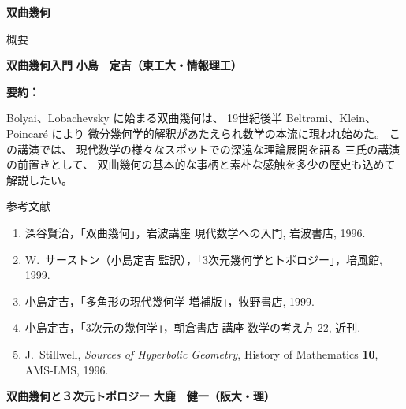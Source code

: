 \documentclass[uplatex,dvipdfmx]{jlreq}
\begin{document}
\begin{center}
  \vspace*{20pt}
  {\Huge\bfseries 双曲幾何}

  \vspace{1pc}
  {\Large 概要}
\end{center}

\vfill

\newpage

\noindent
{\large\bfseries 双曲幾何入門}
\hfill
{\large\bfseries 小島　定吉（東工大・情報理工）}

\bigskip

\noindent\textbf{要約：}

Bolyai、Lobachevsky に始まる双曲幾何は、
19世紀後半 Beltrami、Klein、Poincaré により
微分幾何学的解釈があたえられ数学の本流に現われ始めた。
この講演では、
現代数学の様々なスポットでの深遠な理論展開を語る
三氏の講演の前置きとして、
双曲幾何の基本的な事柄と素朴な感触を多少の歴史も込めて解説したい。

\vspace{6pt}

\begin{center}
  \textsc{参考文献}
\end{center}
\begin{enumerate}
  \item[{[1]}] 深谷賢治，「双曲幾何」，岩波講座 現代数学への入門, 岩波書店, 1996.
  \item[{[2]}] W.~サーストン（小島定吉 監訳），「3次元幾何学とトポロジー」，培風館, 1999.
  \item[{[3]}] 小島定吉，「多角形の現代幾何学 増補版」，牧野書店, 1999.
  \item[{[4]}] 小島定吉，「3次元の幾何学」，朝倉書店 講座 数学の考え方 22, 近刊.
  \item[{[5]}] J.~Stillwell,
        \textit{Sources of Hyperbolic Geometry},
        History of Mathematics \textbf{10},
        AMS-LMS, 1996.
\end{enumerate}

\newpage

\noindent
{\large\bfseries 双曲幾何と３次元トポロジー}
\hfill
{\large\bfseries 大鹿　健一（阪大・理）}
\end{document}
